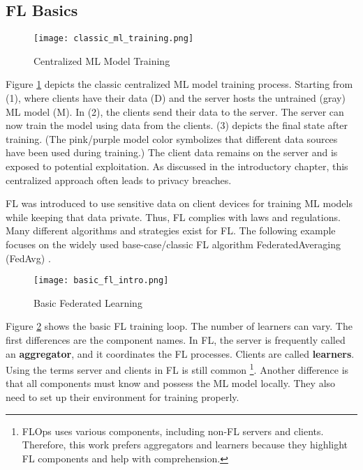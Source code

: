 
\subsection{FL Basics}

\begin{figure}[h]
    \centering
    \texttt{[image: classic\_ml\_training.png]}
    \caption{Centralized ML Model Training}
    \label{fig:classic_ml_training}
\end{figure}
Figure \ref{fig:classic_ml_training} depicts the classic centralized ML model training process.
Starting from (1), where clients have their data (D) and the server hosts the untrained (gray) ML model (M).
In (2), the clients send their data to the server.
The server can now train the model using data from the clients.
(3) depicts the final state after training.
(The pink/purple model color symbolizes that different data sources have been used during training.)
The client data remains on the server and is exposed to potential exploitation.
As discussed in the introductory chapter, this centralized approach often leads to privacy breaches.

FL was introduced to use sensitive data on client devices for training ML models while keeping that data private.
Thus, FL complies with laws and regulations.
Many different algorithms and strategies exist for FL.
The following example focuses on the widely used base-case/classic FL algorithm FederatedAveraging (FedAvg) \cite{paper:original_fl}.

\begin{figure}%
    \centering
    \texttt{[image: basic\_fl\_intro.png]}
    \caption{Basic Federated Learning}
    \label{fig:basic_fl_intro}
\end{figure}
Figure \ref{fig:basic_fl_intro} shows the basic FL training loop.
The number of learners can vary.
The first differences are the component names.
In FL, the server is frequently called an \textbf{aggregator}, and it coordinates the FL processes.
Clients are called \textbf{learners}.
Using the terms server and clients in FL is still common
\footnote{
FLOps uses various components, including non-FL servers and clients.
Therefore, this work prefers aggregators and learners because they highlight FL components and help with comprehension.
}.
Another difference is that all components must know and possess the ML model locally.
They also need to set up their environment for training properly.

